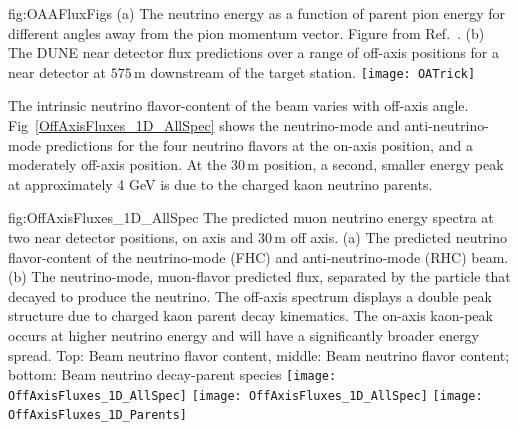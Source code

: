 \begin{dunefigure}{fig:OAAFluxFigs}
{(a) The neutrino energy as a function of parent pion energy for different angles away from the pion momentum vector. Figure from Ref.~\cite{Duffy:2016owt}. (b) The DUNE near detector flux predictions over a range of off-axis positions for a near detector at $575\,\textrm{m}$ downstream of the target station. }
    \texttt{[image: OATrick]}
\end{dunefigure}

The intrinsic neutrino flavor-content of the beam varies with off-axis angle. Fig~\ref{OffAxisFluxes_1D_AllSpec} shows the neutrino-mode and anti-neutrino-mode predictions for the four neutrino flavors at the on-axis position, and a moderately off-axis position. At the $30\,\textrm{m}$ position, a second, smaller energy peak at approximately 4 GeV is due to the charged kaon neutrino parents. 


\begin{dunefigure}{fig:OffAxisFluxes_1D_AllSpec}
{The predicted muon neutrino energy spectra at two near detector positions, on axis and $30\,\textrm{m}$ off axis. (a) The predicted neutrino flavor-content of the neutrino-mode (FHC) and anti-neutrino-mode (RHC) beam. (b) The neutrino-mode, muon-flavor predicted flux, separated by the particle that decayed to produce the neutrino. The off-axis spectrum displays a double peak structure due to charged kaon parent decay kinematics. The on-axis kaon-peak occurs at higher neutrino energy and will have a significantly broader energy spread. Top: Beam neutrino flavor content, middle: Beam neutrino flavor content; bottom: Beam neutrino decay-parent species}
    \texttt{[image: OffAxisFluxes\_1D\_AllSpec]}
    \texttt{[image: OffAxisFluxes\_1D\_AllSpec]}
  \texttt{[image: OffAxisFluxes\_1D\_Parents]}    
    \end{dunefigure}

